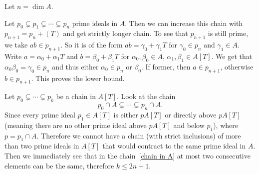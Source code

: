 \begin{exercise}{3}
    Let $n = \dim A$.
    
    Let $p_0 \subsetneq p_1 \subsetneq \cdots \subsetneq p_n$ prime ideals in
    $A$. Then we can increase this chain with $p_{n+1} = p_n + (T)$ and get
    strictly longer chain. To see that $p_{n+1}$ is still prime, we take $ab \in
    p_{n+1}$. So it is of the form $ab = \gamma_0 + \gamma_1 T$ for $\gamma_0
    \in p_n$ and $\gamma_1 \in A$. Write $a = \alpha_0 + \alpha_1 T$ and $b =
    \beta_0 + \beta_1 T$ for $\alpha_0, \beta_0 \in A$, $\alpha_1, \beta_1 \in
    A[T]$. We get that $\alpha_0 \beta_0 = \gamma_0 \in p_n$ and thus either
    $\alpha_0 \in p_n$ or $\beta_0$. If former, then $a \in p_{n+1}$, otherwise
    $b \in p_{n+1}$. This proves the lower bound.

    Let $p_0 \subsetneq \cdots \subsetneq p_k$ be a chain in $A[T]$. Look at the
    chain
    \begin{equation}\label{chain in A}
        p_0 \cap A \subsetneq \cdots \subsetneq p_n \cap A.
    \end{equation}
    Since every prime ideal $p_1 \in A[T]$ is either $pA[T]$ or directly above
    $pA[T]$ (meaning there are no other prime ideal above $pA[T]$ and below
    $p_1$), where $p = p_1 \cap A$. Therefore we cannot have a chain (with
    strict inclusions) of more than two prime ideals in $A[T]$ that would
    contract to the same prime ideal in $A$. Then we immediately see that in the
    chain~\ref{chain in A} at most two consecutive elements can be the same,
    therefore $k \leq 2n + 1$.
\end{exercise}

